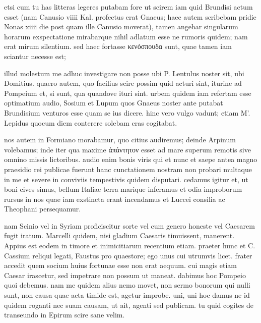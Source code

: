 


 etsi cum tu has litteras legeres putabam fore ut scirem iam quid Brundisi actum esset (nam Canusio viiii Kal. profectus erat Gnaeus; haec autem scribebam pridie Nonas xiiii die post quam ille Canusio moverat), tamen angebar singularum horarum exspectatione mirabarque nihil adlatum esse ne rumoris quidem; nam erat mirum silentium. sed haec fortasse κενόσπουδα sunt, quae tamen iam sciantur necesse est;

 illud molestum me adhuc investigare non posse ubi P. Lentulus noster sit, ubi Domitius. quaero autem, quo facilius scire possim quid acturi sint, iturine ad Pompeium et, si sunt, qua quandove ituri sint. urbem quidem iam refertam esse optimatium audio, Sosium et Lupum quos Gnaeus noster ante putabat Brundisium venturos esse quam se ius dicere. hinc vero vulgo vadunt; etiam M'. Lepidus quocum diem conterere solebam cras cogitabat.

 nos autem in Formiano morabamur, quo citius audiremus; deinde Arpinum volebamus; inde iter qua maxime ἀπάντητον esset ad mare superum remotis sive omnino missis lictoribus. audio enim bonis viris qui et nunc et saepe antea magno praesidio rei publicae fuerunt hanc cunctationem nostram non probari multaque in me et severe in conviviis tempestivis quidem disputari. cedamus igitur et, ut boni cives simus, bellum Italiae terra marique inferamus et odia improborum rursus in nos quae iam exstincta erant incendamus et Luccei consilia ac Theophani persequamur.

 nam Scinio vel in Syriam proficiscitur sorte vel cum genero honeste vel Caesarem fugit iratum. Marcelli quidem, nisi gladium Caesaris timuissent, manerent. Appius est eodem in timore et inimicitiarum recentium etiam. praeter hunc et C. Cassium reliqui legati, Faustus pro quaestore; ego unus cui utrumvis licet. frater accedit quem socium huius fortunae esse non erat aequum. cui magis etiam Caesar irascetur, sed impetrare non possum ut maneat. dabimus hoc Pompeio quoi debemus. nam me quidem alius nemo movet, non sermo bonorum qui nulli sunt, non causa quae acta timide est, agetur improbe. uni, uni hoc damus ne id quidem roganti nec suam causam, ut ait, agenti sed publicam. tu quid cogites de transeundo in Epirum scire sane velim.
